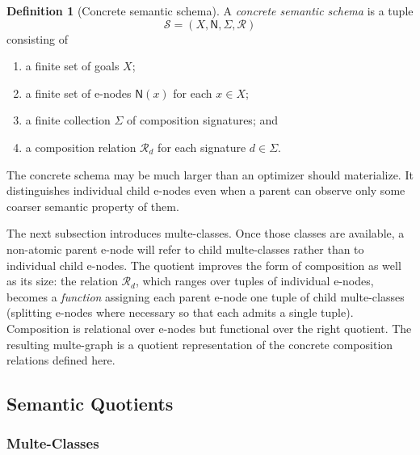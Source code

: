 \documentclass[sigconf,nonacm]{acmart}
\theoremstyle{definition}
\newtheorem{definition}{Definition}[section]
\theoremstyle{plain}
\theoremstyle{remark}
\begin{document}
\begin{definition}[Concrete semantic schema]
\label{def:concrete-schema}
A \emph{concrete semantic schema} is a tuple
\[
\mathcal S=(X,\mathsf N,\Sigma,\mathcal R)
\]
consisting of

\begin{enumerate}

\item
a finite set of goals \(X\);

\item
a finite set of e-nodes \(\mathsf{N}(x)\) for each \(x \in X\);

\item
a finite collection \(\Sigma\) of composition signatures; and

\item
a composition relation \(\mathcal{R}_d\) for each signature
\(d\in\Sigma\).

\end{enumerate}
\end{definition}

The concrete schema may be much larger than an optimizer should
materialize.  It distinguishes individual child e-nodes even when a
parent can observe only some coarser semantic property of them.

The next subsection introduces multe-classes.  Once those classes
are available, a non-atomic parent e-node will refer to child
multe-classes rather than to individual child e-nodes.  The quotient
improves the form of composition as well as its size: the relation
\(\mathcal{R}_d\), which ranges over tuples of individual e-nodes,
becomes a \emph{function} assigning each parent e-node one tuple of
child multe-classes (splitting e-nodes where necessary so that each
admits a single tuple).  Composition is relational over e-nodes but
functional over the right quotient.  The resulting multe-graph is a
quotient representation of the concrete composition relations
defined here.

\subsection{Semantic Quotients}
\label{chap:quotients}

\subsubsection{Multe-Classes}
\label{sec:multe-classes}
\end{document}
